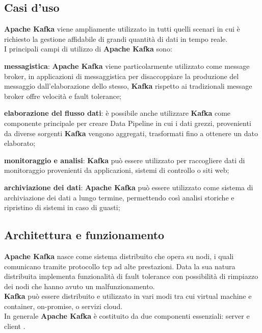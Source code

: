 \subsection{Casi d'uso}
\textbf{Apache Kafka} viene ampliamente utilizzato in tutti quelli scenari in cui è richiesto la gestione 
affidabile di grandi quantità di dati in tempo reale.\\
I principali campi di utilizzo di \textbf{Apache Kafka} sono:
\begin{list}{*}
    \item \textbf{messagistica}: \textbf{Apache Kafka} viene particolarmente utilizzato come \gls{message broker}{}, in applicazioni di messaggistica 
    per disaccoppiare la produzione del messaggio dall'elaborazione dello stesso, \textbf{Kafka} rispetto ai tradizionali \gls{message broker}{} offre velocità e \gls{fault tolerance}{};
    \item \item \textbf{elaborazione del flusso dati}: è possibile anche utilizzare \textbf{Kafka} come componente principale per creare \gls{Data Pipeline}{} in cui i dati grezzi,
    provenienti da diverse sorgenti \textbf{Kafka} vengono aggregati, trasformati fino a ottenere un dato elaborato;
    \item \textbf{monitoraggio e analisi}: \textbf{Kafka} può essere utilizzato per raccogliere dati di monitoraggio provenienti da applicazioni, sistemi di controllo o siti web; 
    \item \textbf{archiviazione dei dati}: \textbf{Apache Kafka} può essere utilizzato come sistema di archiviazione dei dati a lungo termine, permettendo così analisi storiche e ripristino di sistemi 
    in caso di guasti;

\end{list}
\subsection{Architettura e funzionamento}
\textbf{Apache Kafka} nasce come sistema distribuito che opera su nodi, i quali comunicano tramite protocollo
\gls{tcp}{} ad alte prestazioni. Data la sua natura distribuita implementa funzionalità di \gls{fault tolerance}{} con possibilità di rimpiazzo dei nodi che hanno avuto un malfunzionamento.\\  
\textbf{Kafka} può essere distribuito e utilizzato in vari modi tra cui \gls{virtual machine}{} e \gls{container}{}, \gls{on-promise}{}, o servizi cloud.\\
In generale \textbf{Apache Kafka} è costituito da due componenti essenziali: server e client \cite{site:Doc_Kafka}.
